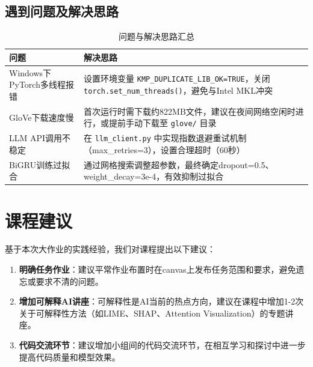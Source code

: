 \documentclass[12pt,a4paper]{article}
\begin{document}
\subsection{遇到问题及解决思路}

\begin{table}[H]
    \centering
    \caption{问题与解决思路汇总}
    \label{tab:problems}
    \begin{tabular}{p{6cm}p{8cm}}
        \toprule
        \textbf{问题} & \textbf{解决思路} \\
        \midrule
        Windows下PyTorch多线程报错 & 设置环境变量 \texttt{KMP\_DUPLICATE\_LIB\_OK=TRUE}，关闭 \texttt{torch.set\_num\_threads()}，避免与Intel MKL冲突 \\
        \midrule
        GloVe下载速度慢 & 首次运行时需下载约822MB文件，建议在夜间网络空闲时进行，或提前手动下载至 \texttt{glove/} 目录 \\
        \midrule
        LLM API调用不稳定 & 在 \texttt{llm\_client.py} 中实现指数退避重试机制（max\_retries=3），设置合理超时（60秒） \\
        \midrule
        BiGRU训练过拟合 & 通过网格搜索调整超参数，最终确定dropout=0.5、weight\_decay=3e-4，有效抑制过拟合 \\
        \bottomrule
    \end{tabular}
\end{table}

\section{课程建议}

基于本次大作业的实践经验，我们对课程提出以下建议：

\begin{enumerate}[leftmargin=2em]
    \item \textbf{明确任务作业}：建议平常作业布置时在canvas上发布任务范围和要求，避免遗忘或要求不清的问题。
    
    \item \textbf{增加可解释AI讲座}：可解释性是AI当前的热点方向，建议在课程中增加1-2次关于可解释性方法（如LIME、SHAP、Attention Visualization）的专题讲座。
    
    \item \textbf{代码交流环节}：建议增加小组间的代码交流环节，在相互学习和探讨中进一步提高代码质量和模型效果。
\end{enumerate}
\end{document}
